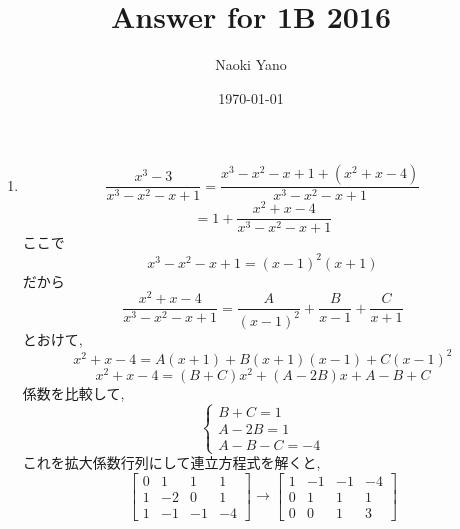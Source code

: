 \documentclass[a4paper,10pt,report]{amsart}
\title{Answer for 1B 2016}
\author{Naoki Yano}
\date{\today}
\theoremstyle{plain}
\theoremstyle{definition}
\theoremstyle{remark}
\begin{document}
    \maketitle
    \begin{enumerate}
        \item 
        \begin{equation*}
            \frac{x^{3}-3}{x^{3}-x^{2}-x+1}=\frac{x^{3}-x^{2}-x+1+(x^{2}+x-4)}{x^{3}-x^{2}-x+1}
        \end{equation*}
        \begin{equation*}
            =1+\frac{x^{2}+x-4}{x^{3}-x^{2}-x+1}
        \end{equation*}
        ここで
        \begin{equation*}
            x^{3}-x^{2}-x+1=(x-1)^{2}(x+1)
        \end{equation*}
        だから
        \begin{equation*}
            \frac{x^{2}+x-4}{x^{3}-x^{2}-x+1}=\frac{A}{{(x-1)}^{2}}+\frac{B}{x-1}+\frac{C}{x+1}
        \end{equation*}
        とおけて, 
        \begin{equation*}
            x^{2}+x-4=A(x+1)+B(x+1)(x-1)+C{(x-1)}^{2}
        \end{equation*}
        \begin{equation*}
            x^{2}+x-4=(B+C)x^{2}+(A-2B)x+A-B+C
        \end{equation*}
        係数を比較して,
        \begin{equation*}
            \begin{cases}
                B+C=1\\
                A-2B=1\\
                A-B-C=-4
            \end{cases}
        \end{equation*}
        これを拡大係数行列にして連立方程式を解くと, 
        \begin{equation*}
            \begin{bmatrix}
                0 & 1 & 1 & 1\\
                1 & -2 & 0 & 1\\
                1 & -1 & -1 & -4
            \end{bmatrix}
            \to \begin{bmatrix}
                1 & -1 & -1 & -4\\
                0 & 1 & 1 & 1\\
                0 & 0 & 1 & 3

\end{bmatrix}
\end{equation*}
\end{enumerate}
\end{document}

